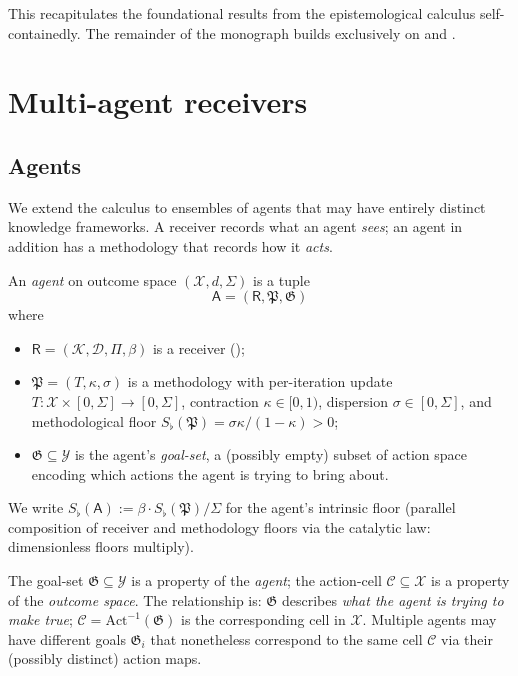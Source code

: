 \documentclass[11pt,a4paper]{article}
\newcommand{\K}{\mathcal{K}}
\newcommand{\D}{\mathcal{D}}
\newcommand{\X}{\mathcal{X}}
\newcommand{\Y}{\mathcal{Y}}
\newcommand{\Cell}{\mathcal{C}}
\newcommand{\Method}{\mathfrak{P}}
\newcommand{\Goal}{\mathfrak{G}}
\newcommand{\receiver}{\mathsf{R}}
\newcommand{\agent}{\mathsf{A}}
\newcommand{\Sfloor}{S_{\flat}}
\newcommand{\Action}{\mathrm{Act}}
\begin{document}
This recapitulates the foundational results from the epistemological
calculus self-containedly. The remainder of the monograph builds
exclusively on  and .

\section{Multi-agent receivers}
\label{sec:multi-agent}

\subsection{Agents}

We extend the calculus to ensembles of agents that may have entirely
distinct knowledge frameworks. A receiver records what an agent
\emph{sees}; an agent in addition has a methodology that records how
it \emph{acts}.

\begin{definition}[Agent]\label{def:agent}
An \emph{agent} on outcome space $(\X,d,\Sigma)$ is a tuple
\[
\agent=(\receiver,\Method,\Goal)
\]
where
\begin{itemize}[leftmargin=*]
\item $\receiver=(\K,\D,\Pi,\beta)$ is a receiver
();
\item $\Method=(T,\kappa,\sigma)$ is a methodology with
per-iteration update $T:\X\times[0,\Sigma]\to[0,\Sigma]$,
contraction $\kappa\in[0,1)$, dispersion $\sigma\in[0,\Sigma]$, and
methodological floor $\Sfloor(\Method)=\sigma\kappa/(1-\kappa)>0$;
\item $\Goal\subseteq\Y$ is the agent's \emph{goal-set}, a (possibly
empty) subset of action space encoding which actions the agent is
trying to bring about.
\end{itemize}
We write $\Sfloor(\agent):=\beta\cdot\Sfloor(\Method)/\Sigma$ for the
agent's intrinsic floor (parallel composition of receiver and
methodology floors via the catalytic law: dimensionless floors
multiply).
\end{definition}

\begin{remark}\label{rem:goal-vs-cell}
The goal-set $\Goal\subseteq\Y$ is a property of the \emph{agent}; the
action-cell $\Cell\subseteq\X$ is a property of the \emph{outcome
space}. The relationship is:
$\Goal$ describes \emph{what the agent is trying to make true};
$\Cell=\Action^{-1}(\Goal)$ is the corresponding cell in $\X$.
Multiple agents may have different goals $\Goal_i$ that nonetheless
correspond to the same cell $\Cell$ via their (possibly distinct)
action maps.
\end{remark}
\end{document}
